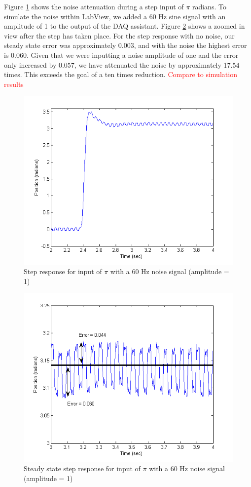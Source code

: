 \documentclass{article}
\newcommand{\xxx}[1]{\textcolor{red}{#1}}
\theoremstyle{plain}
\theoremstyle{definition}
\theoremstyle{remark}
\begin{document}
Figure \ref{PosNoise} shows the noise attenuation during a step input of $\pi$ radians. To simulate the noise within LabView, we added a 60 Hz sine signal with an amplitude of 1 to the output of the DAQ assistant. Figure \ref{PosNoiseZoom} shows a zoomed in view after the step has taken place. For the step response with no noise, our steady state error was approximately 0.003, and with the noise the highest error is 0.060. Given that we were inputting a noise amplitude of one and the error only increased by 0.057, we have attenuated the noise by approximately 17.54 times. This exceeds the goal of a ten times reduction.
\xxx{Compare to simulation results}

\begin{figure}[htb]
\begin{center}
\includegraphics[width = 12cm]{PosNoise.png}
\caption{Step response for input of $\pi$ with a 60 Hz noise signal (amplitude = 1)}
\label{PosNoise}
\end{center}
\end{figure}

\begin{figure}[htb]
\begin{center}
\includegraphics[width = 12cm]{PosNoiseZoom.png}
\caption{Steady state step response for input of $\pi$ with a 60 Hz noise signal (amplitude = 1)}
\label{PosNoiseZoom}
\end{center}
\end{figure}
\end{document}
